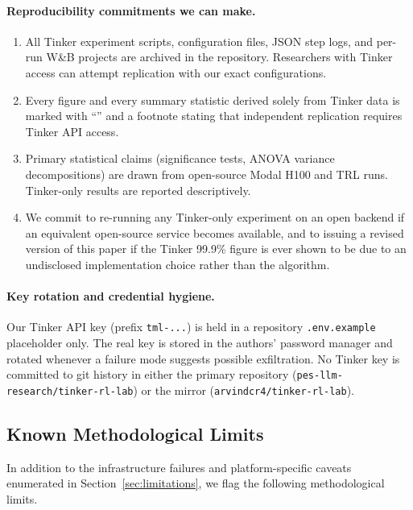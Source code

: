 \paragraph{Reproducibility commitments we can make.}
\begin{enumerate}
  \item All Tinker experiment scripts, configuration files, JSON step
        logs, and per-run W\&B projects are archived in the repository.
        Researchers with Tinker access can attempt replication with our
        exact configurations.
  \item Every figure and every summary statistic derived solely from
        Tinker data is marked with ``\dag'' and a footnote stating that
        independent replication requires Tinker API access.
  \item Primary statistical claims (significance tests, ANOVA variance
        decompositions) are drawn from open-source Modal H100 and TRL
        runs. Tinker-only results are reported descriptively.
  \item We commit to re-running any Tinker-only experiment on an open
        backend if an equivalent open-source service becomes available,
        and to issuing a revised version of this paper if the Tinker
        99.9\% figure is ever shown to be due to an undisclosed
        implementation choice rather than the algorithm.
\end{enumerate}

\paragraph{Key rotation and credential hygiene.}
Our Tinker API key (prefix \texttt{tml-...}) is held in a repository
\texttt{.env.example} placeholder only. The real key is stored in the
authors' password manager and rotated whenever a failure mode suggests
possible exfiltration. No Tinker key is committed to git history in
either the primary repository (\texttt{pes-llm-research/tinker-rl-lab}) or
the mirror (\texttt{arvindcr4/tinker-rl-lab}).

\subsection{Known Methodological Limits}
\label{sec:methodlimits}

In addition to the infrastructure failures and platform-specific caveats
enumerated in Section~\ref{sec:limitations}, we flag the following
methodological limits.

